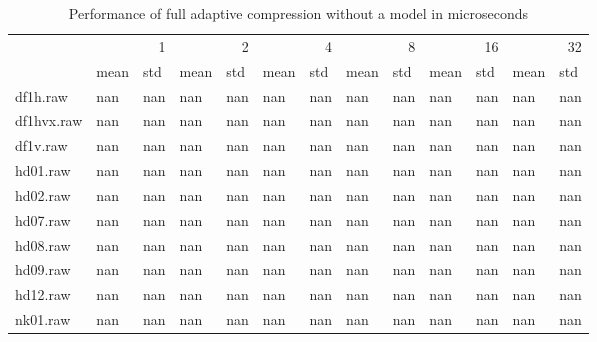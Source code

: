 \begin{table}
\caption{Performance of full adaptive compression without a model in microseconds}
\begin{tabular}{lllllllllllll}
 & \multicolumn{2}{r}{1} & \multicolumn{2}{r}{2} & \multicolumn{2}{r}{4} & \multicolumn{2}{r}{8} & \multicolumn{2}{r}{16} & \multicolumn{2}{r}{32} \\
 & mean & std & mean & std & mean & std & mean & std & mean & std & mean & std \\
df1h.raw & nan & nan & nan & nan & nan & nan & nan & nan & nan & nan & nan & nan \\
df1hvx.raw & nan & nan & nan & nan & nan & nan & nan & nan & nan & nan & nan & nan \\
df1v.raw & nan & nan & nan & nan & nan & nan & nan & nan & nan & nan & nan & nan \\
hd01.raw & nan & nan & nan & nan & nan & nan & nan & nan & nan & nan & nan & nan \\
hd02.raw & nan & nan & nan & nan & nan & nan & nan & nan & nan & nan & nan & nan \\
hd07.raw & nan & nan & nan & nan & nan & nan & nan & nan & nan & nan & nan & nan \\
hd08.raw & nan & nan & nan & nan & nan & nan & nan & nan & nan & nan & nan & nan \\
hd09.raw & nan & nan & nan & nan & nan & nan & nan & nan & nan & nan & nan & nan \\
hd12.raw & nan & nan & nan & nan & nan & nan & nan & nan & nan & nan & nan & nan \\
nk01.raw & nan & nan & nan & nan & nan & nan & nan & nan & nan & nan & nan & nan \\
\end{tabular}
\end{table}
